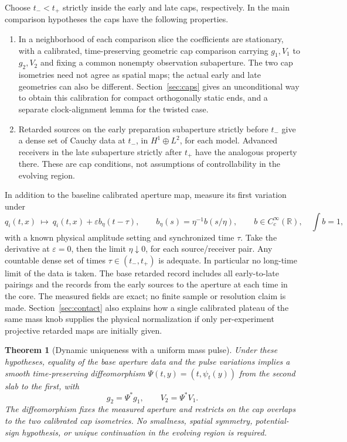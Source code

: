 \documentclass[11pt]{article}
\numberwithin{equation}{section}
\newtheorem{theorem}{Theorem}[section]
\newcommand\RR{\mathbb R}
\begin{document}
Choose \(t_-<t_+\) strictly inside the early and late caps, respectively. In the main comparison hypotheses the caps have the following properties.
\begin{enumerate}
 \item In a neighborhood of each comparison slice the coefficients are stationary, with a calibrated, time-preserving geometric cap comparison carrying \(g_1,V_1\) to \(g_2,V_2\) and fixing a common nonempty observation subaperture. The two cap isometries need not agree as spatial maps; the actual early and late geometries can also be different. Section~\ref{sec:caps} gives an unconditional way to obtain this calibration for compact orthogonally static ends, and a separate clock-alignment lemma for the twisted case.
 \item Retarded sources on the early preparation subaperture strictly before \(t_-\) give a dense set of Cauchy data at \(t_-\), in \(H^1\oplus L^2\), for each model. Advanced receivers in the late subaperture strictly after \(t_+\) have the analogous property there. These are cap conditions, not assumptions of controllability in the evolving region.
\end{enumerate}

In addition to the baseline calibrated aperture map, measure its first variation under
\[
 q_i(t,x)\ \longmapsto\ q_i(t,x)+\varepsilon b_\eta(t-\tau),\qquad
 b_\eta(s)=\eta^{-1}b(s/\eta),
 \qquad b\in C^\infty_c(\RR),\quad \int b=1 ,
\]
with a known physical amplitude setting and synchronized time \(\tau\). Take the derivative at \(\varepsilon=0\), then the limit \(\eta\downarrow0\), for each source/receiver pair. Any countable dense set of times \(\tau\in(t_-,t_+)\) is adequate. In particular no long-time limit of the data is taken. The base retarded record includes all early-to-late pairings and the records from the early sources to the aperture at each time in the core. The measured fields are exact; no finite sample or resolution claim is made. Section~\ref{sec:contact} also explains how a single calibrated plateau of the same mass knob supplies the physical normalization if only per-experiment projective retarded maps are initially given.

\begin{theorem}[Dynamic uniqueness with a uniform mass pulse]\label{thm:main}
Under these hypotheses, equality of the base aperture data and the pulse variations implies a smooth time-preserving diffeomorphism \(\Psi(t,y)=(t,\psi_t(y))\) from the second slab to the first, with
\[
 g_2=\Psi^*g_1,\qquad V_2=\Psi^*V_1 .
\]
The diffeomorphism fixes the measured aperture and restricts on the cap overlaps to the two calibrated cap isometries. No smallness, spatial symmetry, potential-sign hypothesis, or unique continuation in the evolving region is required.
\end{theorem}
\end{document}
